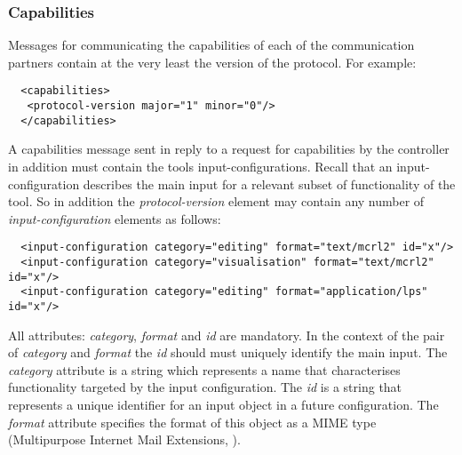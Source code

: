 \documentclass{article}
\begin{document}

   

  \subsubsection{Capabilities}

   Messages for communicating the capabilities of each of the communication
   partners contain at the very least the version of the protocol. For example:

   \small \begin{verbatim}
  <capabilities>
   <protocol-version major="1" minor="0"/>
  </capabilities>\end{verbatim}
  \normalsize

   \noindent A capabilities message sent in reply to a request for capabilities by the
   controller in addition must contain the tools input-configurations. Recall
   that an input-configuration describes the main input for a relevant subset
   of functionality of the tool. So in addition the \textit{protocol-version}
   element may contain any number of \textit{input-configuration} elements as
   follows:

   \small \begin{verbatim}
  <input-configuration category="editing" format="text/mcrl2" id="x"/>
  <input-configuration category="visualisation" format="text/mcrl2" id="x"/>
  <input-configuration category="editing" format="application/lps" id="x"/>\end{verbatim}
  \normalsize

   \noindent All attributes: \textit{category}, \textit{format} and \textit{id} are
   mandatory. In the context of the pair of \textit{category} and
   \textit{format} the \textit{id} should must uniquely identify the main
   input. The \textit{category} attribute is a string which represents a name
   that characterises functionality targeted by the input configuration. The
   \textit{id} is a string that represents a unique identifier for an input
   object in a future configuration. The \textit{format} attribute specifies
   the format of this object as a MIME type (Multipurpose Internet Mail
   Extensions, \cite{rfc2822}).
\end{document}
